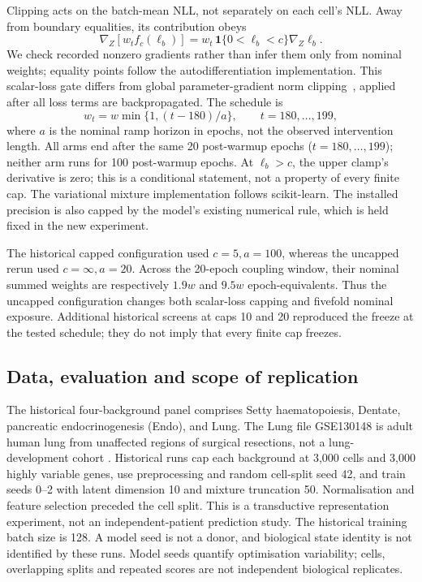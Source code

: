 \documentclass[11pt]{article}
\begin{document}
Clipping acts on the batch-mean NLL, not separately on each cell's NLL. Away from boundary equalities, its contribution obeys
\begin{equation}
 \nabla_Z[w_t f_c(\ell_b)]
   =w_t\,\mathbf 1\{0<\ell_b<c\}\nabla_Z\ell_b.\label{eq:active-gradient}
\end{equation}
We check recorded nonzero gradients rather than infer them only from nominal weights; equality points follow the autodifferentiation implementation. This scalar-loss gate differs from global parameter-gradient norm clipping~\cite{pascanu2013difficulty}, applied after all loss terms are backpropagated. The schedule is
\begin{equation}
 w_t=w\min\{1,(t-180)/a\},\qquad t=180,\ldots,199,
\end{equation}
where $a$ is the nominal ramp horizon in epochs, not the observed intervention length. All arms end after the same 20 post-warmup epochs ($t=180,\ldots,199$); neither arm runs for 100 post-warmup epochs. At $\ell_b>c$, the upper
clamp's derivative is zero; this is a conditional statement, not a property
of every finite cap. The variational mixture implementation follows scikit-learn\cite{sklearn18bgm}. The installed precision is also capped by the model's
existing numerical rule, which is held fixed in the new experiment.

The historical capped configuration used $c=5,a=100$, whereas the uncapped
rerun used $c=\infty,a=20$. Across the 20-epoch coupling window, their nominal
summed weights are respectively $1.9w$ and $9.5w$ epoch-equivalents. Thus the
uncapped configuration changes both scalar-loss capping and fivefold nominal
exposure. Additional historical screens at caps 10 and 20 reproduced the
freeze at the tested schedule; they do not imply that every finite cap freezes.


\subsection{Data, evaluation and scope of replication}
The historical four-background panel comprises Setty haematopoiesis,
Dentate\cite{hochgerner2018conserved}, pancreatic endocrinogenesis (Endo)\cite{bastidas2019endocrinogenesis}, and Lung. The Lung file GSE130148 is adult human lung from
unaffected regions of surgical resections, not a lung-development cohort
\cite{vieirabraga2019lung}. Historical runs cap each background at 3,000
cells and 3,000 highly variable genes, use preprocessing and random cell-split
seed 42, and train seeds 0--2 with latent dimension 10 and mixture truncation
50. Normalisation and feature selection preceded the cell split. This is a
transductive representation experiment, not an independent-patient prediction
study. The historical training batch size is 128. A model seed is not a donor,
and biological state identity is not identified by these runs.
Model seeds quantify optimisation variability; cells, overlapping
splits and repeated scores are not independent biological replicates.
\end{document}
